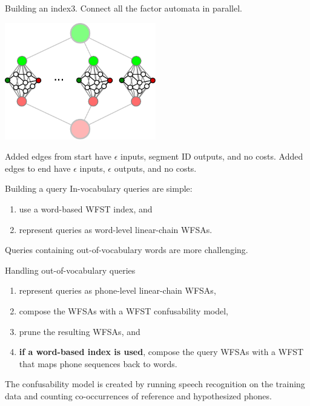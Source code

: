 \begin{frame}{Building an index}{3. Connect all the factor automata in parallel.}
  \begin{center}
    \includegraphics[width=66mm]{figures/index}
    \end{center}
  \vfill
  Added edges from start have $\epsilon$ inputs, segment ID outputs, and no costs.
  Added edges to end have $\epsilon$ inputs, $\epsilon$ outputs, and no costs.
\end{frame}

\begin{frame}{Building a query}{}
  In-vocabulary queries are simple:
  \begin{enumerate}
  \item use a word-based WFST index, and
  \item represent queries as word-level linear-chain WFSAs.
  \end{enumerate}
  \vfill
  Queries containing \alert{out-of-vocabulary} words are more challenging.
\end{frame}

\begin{frame}{Handling out-of-vocabulary queries}{}
  \begin{enumerate}
  \item represent queries as phone-level linear-chain WFSAs,
  \item compose the WFSAs with a WFST \alert{confusability} model,
  \item prune the resulting WFSAs, and
  \item {\bf if a word-based index is used}, compose the query WFSAs
    with a WFST that maps phone sequences back to words.
  \end{enumerate}
  \vfill
  The confusability model is created by running speech recognition on
  the training data and counting co-occurrences of reference and
  hypothesized phones.
  \vfill
\end{frame}

